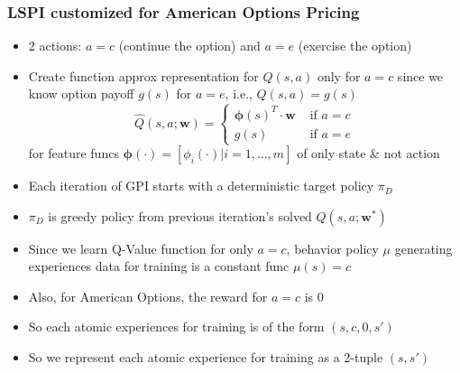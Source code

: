 \documentclass[handout]{beamer}
\begin{document}
\begin{frame}
\frametitle{LSPI customized for American Options Pricing}
\pause
\begin{itemize}[<+->]
\item 2 actions: $a=c$ (continue the option) and $a=e$ (exercise the option)
\item Create function approx representation for $Q(s,a)$ only for $a=c$ since we know option payoff $g(s)$ for $a=e$, i.e., $Q(s,a) = g(s)$
$$
\hat{Q}(s,a; \bm{w}) =
\begin{cases}
\bm{\phi}(s)^T \cdot \bm{w} & \text{ if } a = c \\
g(s) & \text{ if } a = e
\end{cases}
$$
for feature funcs $\bm{\phi}(\cdot) = [\phi_i(\cdot)|i = 1, \ldots, m]$ of only state \& not action
\item Each iteration of GPI starts with a deterministic target policy $\pi_D$
\item $\pi_D$ is greedy policy from previous iteration's solved $Q(s,a;\bm{w}^*)$
\item Since we learn Q-Value function for only $a=c$, behavior policy $\mu$ generating experiences data for training is a constant func $\mu(s) = c$
\item Also, for American Options, the reward for $a=c$ is 0
\item So each atomic experiences for training is of the form $(s,c,0,s')$
\item So we represent each atomic experience for training as a 2-tuple $(s,s')$
\end{itemize}
\end{frame}
\end{document}
